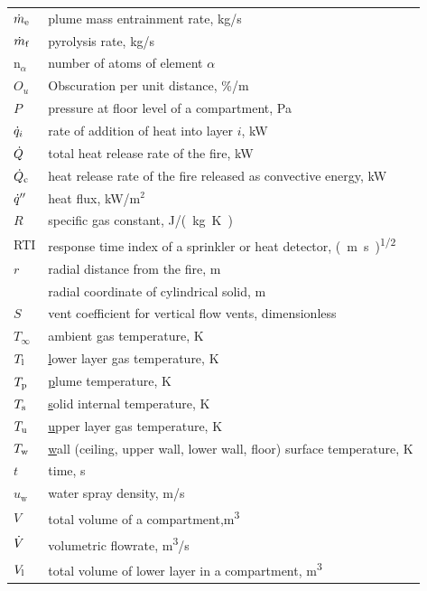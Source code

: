 \documentclass[12pt,twoside]{book}
\begin{document}
\begin{center}
\begin{longtable}{p{1in}  p{5.5 in}}
$\dot{m}\sb{\mathrm{e}}$              & plume mass entrainment rate, kg/s \\
$\dot{m}\sb{\mathrm{f}}$              & pyrolysis rate, kg/s \\
n$_\alpha$          & number of atoms of element $\alpha$ \\
$O_u$               & Obscuration per unit distance, \%/m \\
$P$                 & pressure at floor level of a compartment, Pa \\
$\dot{q}\sb{i}$              & rate of addition of heat into layer $i$, kW \\
$\dot{Q}$               & total heat release rate of the fire, kW \\
$\dot{Q}\sb{\mathrm{c}}$              & heat release rate of the fire released as convective energy, kW \\
$\dot{q}''$             & heat flux, kW/m$^2$ \\
$R$                 & specific gas constant, \unit{J/(kg.K)} \\
RTI                 & response time index of a sprinkler or heat detector, \unit{(m.s)^{1/2}} \\
$r$                 & radial distance from the fire, m \\
                    & radial coordinate of cylindrical solid, m \\
$S$                 & vent coefficient for vertical flow vents, dimensionless \\
$T_\infty$          & ambient gas temperature, K \\
$T\sb{\mathrm{l}}$               & \underline{l}ower layer gas temperature, K \\
$T\sb{\mathrm{p}}$               & \underline{p}lume temperature, K \\
$T\sb{\mathrm{s}}$               & \underline{s}olid internal temperature, K \\
$T\sb{\mathrm{u}}$               & \underline{u}pper layer gas temperature, K \\
$T\sb{\mathrm{w}}$               & \underline{w}all (ceiling, upper wall, lower wall, floor) surface temperature, K \\
$t$                 & time, s \\
$u_{\mathrm{w}}$         & water spray density, m/s \\
$V$                 & total volume of a compartment,\unit{m^3} \\
$\dot{V}$               & volumetric flowrate, \unit{m^3/s} \\
$V\sb{\mathrm{l}}$               & total volume of lower layer in a compartment, \unit{m^3} \\

\end{longtable}
\end{center}
\end{document}
